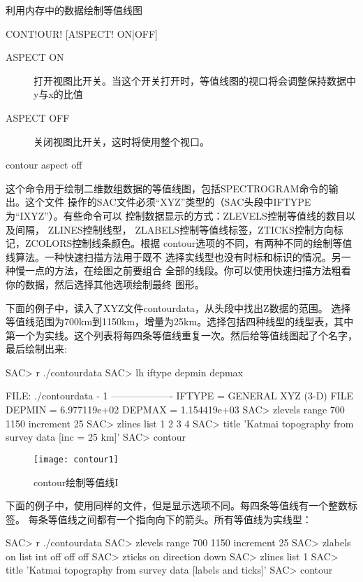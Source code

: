 \label{cmd:contour}

利用内存中的数据绘制等值线图

\begin{SACSTX}
CONT!OUR! [A!SPECT! ON|OFF]
\end{SACSTX}

\begin{description}
\item [ASPECT ON] 打开视图比开关。当这个开关打开时，等值线图的视口将会调整保持数据中y与x的比值
\item [ASPECT OFF] 关闭视图比开关，这时将使用整个视口。
\end{description}

\begin{SACDFT}
contour  aspect  off
\end{SACDFT}

这个命令用于绘制二维数组数据的等值线图，包括SPECTROGRAM命令的输出。这个文件
操作的SAC文件必须``XYZ''类型的（SAC头段中IFTYPE为``IXYZ''）。有些命令可以
控制数据显示的方式：ZLEVELS控制等值线的数目以及间隔， ZLINES控制线型，
ZLABELS控制等值线标签，ZTICKS控制方向标记，ZCOLORS控制线条颜色。根据
contour选项的不同，有两种不同的绘制等值线算法。一种快速扫描方法用于既不
选择实线型也没有时标和标识的情况。另一种慢一点的方法，在绘图之前要组合
全部的线段。你可以使用快速扫描方法粗看你的数据，然后选择其他选项绘制最终
图形。

下面的例子中，读入了XYZ文件contourdata，从头段中找出Z数据的范围。
选择等值线范围为700km到1150km，增量为25km。选择包括四种线型的线型表，其中第一个为实线。这个列表将每四条等值线重复一次。然后给等值线图起了个名字，最后绘制出来:
\begin{SACCode}
SAC> r ./contourdata 
SAC> lh iftype depmin depmax
  
  FILE: ./contourdata - 1
 -------------------
       IFTYPE = GENERAL XYZ (3-D) FILE
       DEPMIN = 6.977119e+02
       DEPMAX = 1.154419e+03
SAC> zlevels range 700 1150 increment 25
SAC> zlines list 1 2 3 4
SAC> title 'Katmai topography from survey data [inc = 25 km]'
SAC> contour
\end{SACCode}

\begin{figure}[H]
\centering
\texttt{[image: contour1]}
\caption{contour绘制等值线I}
\end{figure}

下面的例子中，使用同样的文件，但是显示选项不同。每四条等值线有一个整数标签。
每条等值线之间都有一个指向向下的箭头。所有等值线为实线型：
\begin{SACCode}
SAC> r ./contourdata 
SAC> zlevels range 700 1150 increment 25
SAC> zlabels on list int off off off
SAC> zticks on direction down
SAC> zlines list 1
SAC> title 'Katmai topography from survey data [labels and ticks]'
SAC> contour
\end{SACCode}

